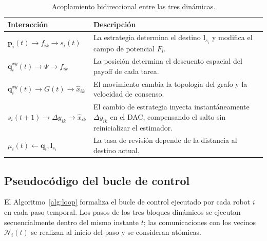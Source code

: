 

\begin{table}[htbp]
\centering
\caption[Acoplamiento entre dinámicas]{Acoplamiento bidireccional entre las tres dinámicas.}
\label{tab:acoplamiento}
\begin{tabularx}{\textwidth}{>{\bfseries}p{}Y}
\toprule
Interacción & Descripción \\
\midrule
$\mathbf{p}_i(t) \to f_{ik} \to s_i(t)$ &
  La estrategia determina el destino $\mathbf{l}_{s_i}$ y modifica el campo de
  potencial $F_i$. \\
$\mathbf{q}_i^{xy}(t) \to \Psi \to f_{ik}$ &
  La posición determina el descuento espacial del payoff de cada tarea. \\
$\mathbf{q}_i^{xy}(t) \to G(t) \to \hat{x}_{ik}$ &
  El movimiento cambia la topología del grafo y la velocidad de consenso. \\
$s_i(t{+}1) \to \Delta y_{ik} \to \hat{x}_{ik}$ &
  El cambio de estrategia inyecta instantáneamente $\Delta y_{ik}$ en el DAC,
  compensando el salto sin reinicializar el estimador. \\
$\mu_i(t) \gets \mathbf{q}_i, \mathbf{l}_{s_i}$ &
  La tasa de revisión depende de la distancia al destino actual. \\
\bottomrule
\end{tabularx}
\end{table}

\subsection{Pseudocódigo del bucle de control}
\label{subsec:pseudocodigo}

El Algoritmo~\ref{alg:loop} formaliza el bucle de control ejecutado por cada robot
$i$ en cada paso temporal. Los pasos de los tres bloques dinámicos se ejecutan
secuencialmente dentro del mismo instante $t$; las comunicaciones con los vecinos
$\mathcal{N}_i(t)$ se realizan al inicio del paso y se consideran atómicas.

